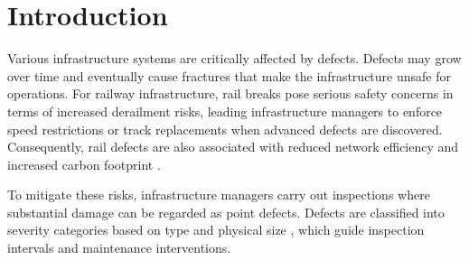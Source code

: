 

%

\section{Introduction} \label{sec:introduction} %
Various infrastructure systems are critically affected by defects. Defects may grow over time and eventually cause fractures that make the infrastructure unsafe for operations.
For railway infrastructure, rail breaks pose serious safety concerns in terms of increased derailment risks, leading infrastructure managers to enforce speed restrictions or track replacements when advanced defects are discovered. 
Consequently, rail defects are also associated with reduced network efficiency and increased carbon footprint \citep{cannon2003a,Zoeteman2014DutchBeyond}.  

To mitigate these risks, infrastructure managers carry out inspections where substantial damage can be regarded as point defects. 
Defects are classified into severity categories based on type and physical size \citep{UIC_2002_defecthandbook}, which guide inspection intervals and maintenance interventions.  

